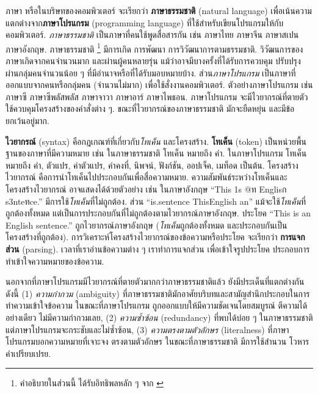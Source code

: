 ภาษา หรือในบริษทของคอมพิวเตอร์ จะเรียกว่า \textbf{ภาษาธรรมชาติ} (natural language) เพื่อเน้นความแตกต่างจาก\textbf{ภาษาโปรแกรม} (programming language) ที่ใช้สำหรับเขียนโปรแกรมให้กับคอมพิวเตอร์.
\textit{ภาษาธรรมชาติ} เป็นภาษาที่คนใช้พูดสื่อสารกัน เช่น ภาษาไทย ภาษาจีน ภาษาสเปน ภาษาอังกฤษ.
ภาษาธรรมชาติ%
\footnote{คำอธิบายในส่วนนี้ ได้รับอิทธิพลหลัก ๆ จาก \cite{ThinkPython}}
มีการเกิด การพัฒนา การวิวัฒนาการตามธรรมชาติ.
วิวัฒนการของภาษาเกิดจากคนจำนวนมาก และผ่านผู้คนหลายรุ่น
แม้ว่าอาจมีบางครั้งที่ได้รับการควบคุม ปรับปรุง ผ่านกลุ่มคนจำนวนน้อย ๆ ที่มีอำนาจหรือที่ได้รับมอบหมายบ้าง.
ส่วน\textit{ภาษาโปรแกรม} 
เป็นภาษาที่ออกแบบจากคนหรือกลุ่มคน (จำนวนไม่มาก) เพื่อใช้สั่งงานคอมพิวเตอร์.
ตัวอย่างภาษาโปรแกรม เช่น ภาษาซี ภาษาซีพลัสพลัส ภาษาจาวา ภาษาอาร์ ภาษาไพธอน.
ภาษาโปรแกรม จะมีไวยากรณ์ที่ตายตัว ใช้ควบคุมโครงสร้างของคำสั่งต่าง ๆ.
ขณะที่ไวยากรณ์ของภาษาธรรมชาติ มักจะยืดหยุ่น และมีข้อยกเว้นอยู่มาก.

\textbf{ไวยากรณ์} (syntax) คือกฎเกณฑ์ที่เกี่ยวกับ\textit{โทเค็น} และโครงสร้าง.
\textbf{โทเค็น} (token) เป็นหน่วยพื้นฐานของภาษาที่มีความหมาย 
เช่น ในภาษาธรรมชาติ โทเค็น หมายถึง คำ.
ในภาษาโปรแกรม โทเค็น หมายถึง คำ, ตัวแปร, ค่าตัวแปร, ค่าคงที่, นิพจน์, ฟังก์ชัน, ออปเจ็ค, เมท็อด เป็นต้น.
โครงสร้างไวยากรณ์ คือการนำโทเค็นไปประกอบกันเพื่อสื่อความหมาย.
ความสัมพันธ์ระหว่างโทเค็นและโครงสร้างไวยากรณ์ อาจแสดงได้ด้วยตัวอย่าง เช่น
ในภาษาอังกฤษ ``This 1s @ท Englisก s3nteทce.'' มีการใช้\textit{โทเค็น}ที่ไม่ถูกต้อง.
ส่วน ``is.sentence ThisEnglish an'' แม้จะใช้\textit{โทเค็น}ที่ถูกต้องทั้งหมด แต่เป็นการประกอบกันที่ไม่ถูกต้องตามไวยากรณ์ภาษาอังกฤษ.
ประโยค ``This is an English sentence.'' ถูกไวยากรณ์ภาษาอังกฤษ (\textit{โทเค็น}ถูกต้องทั้งหมด และประกอบกันเป็นโครงสร้างที่ถูกต้อง). 
การวิเคราะห์โครงสร้างไวยากรณ์ของข้อความหรือประโยค จะเรียกว่า \textbf{การแจกส่วน} (parsing).
เวลาที่เราอ่านข้อความต่าง ๆ เราทำการแจกส่วน เพื่อเข้าใจรูปประโยค ประกอบการทำเข้าใจความหมายของข้อความ.

นอกจากที่ภาษาโปรแกรมมีไวยากรณ์ที่ตายตัวมากกว่าภาษาธรรมชาติแล้ว
ยังมีประเด็นที่แตกต่างกันดังนี้
(1) \textit{ความกำกวม} (ambiguity) 
ที่ภาษาธรรมชาติมักอาศัยบริบทและสามัญสำนึกประกอบในการทำความเข้าใจข้อความ
ในขณะที่ภาษาโปรแกรม ถูกออกแบบให้มีความชัดเจนโดยสมบูรณ์ ตีความได้อย่างเดียว ไม่มีความกำกวมเลย,
(2) \textit{ความซ้ำซ้อน} (redundancy)
ที่พบได้บ่อย ๆ ในภาษาธรรมชาติ
แต่ภาษาโปรแกรมจะกระชับและไม่ซ้ำซ้อน,
(3)  \textit{ความตรงตามตัวอักษร} (literalness)
ที่ภาษาโปรแกรมบอกความหมายที่เจาะจง ตรงตามตัวอักษร
ในขณะที่ภาษาธรรมชาติ มีการใช้สำนวน โวหาร คำเปรียบเปรย.

